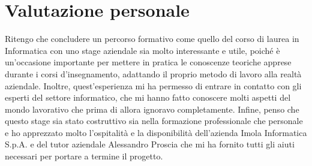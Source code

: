 
\section{Valutazione personale}\label{sec:valutazione-personale}
Ritengo che concludere un percorso formativo come quello del corso di laurea in Informatica con uno stage aziendale sia molto interessante e utile, poiché è un'occasione importante per mettere in pratica le conoscenze teoriche apprese durante i corsi d'insegnamento, adattando il proprio metodo di lavoro alla realtà aziendale.
Inoltre, quest'esperienza mi ha permesso di entrare in contatto con gli esperti del settore informatico, che mi hanno fatto conoscere molti aspetti del mondo lavorativo che prima di allora ignoravo completamente.
Infine, penso che questo stage sia stato costruttivo sia nella formazione professionale che personale e ho apprezzato molto l'ospitalità e la disponibilità dell'azienda Imola Informatica S.p.A. e del tutor aziendale Alessandro Proscia che mi ha fornito tutti gli aiuti necessari per portare a termine il progetto.
